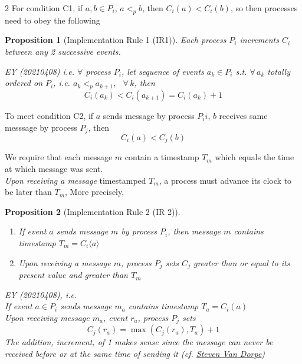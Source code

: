 \documentclass[10pt]{amsart}
\newtheorem{proposition}{Proposition}
\begin{document}
\begin{multicols*}{2}
For condition C1, if $a,b \in P_i$, $a<_p b$, then $C_i(a) < C_i(b)$, so then processes need to obey the following

\begin{proposition}[Implementation Rule 1 (IR1)]\label{IR1}
Each process $P_i$ increments $C_i$ between any 2 successive events.

EY (20210408) i.e. $\forall $ process $P_i$, let sequence of events $a_k \in P_i$ s.t. $\forall \, a_k$ totally ordered on $P_i$, i.e. $a_k <_p a_{k+1}$, \, $\forall \, k$, then
\begin{equation}
\boxed{ 
	C_i(a_k) < C_i(a_{k+1}) = C_i(a_k) + 1 }
\end{equation}
\end{proposition} 

To meet condition C2, if $a$ sends message by process $P_ii$, $b$ receives same messsage by process $P_j$, then 
\[
C_i(a) < C_j(b)
\]

We require that each message $m$ contain a timestamp $T_m$ which equals the time at which message was sent.\\
\emph{Upon receiving a message} timestamped $T_m$, a process must advance its clock to be later than $T_m$, More precisely,

\begin{proposition}[Implementation Rule 2 (IR 2)]
\begin{enumerate}
	\item If event $a$ sends message $m$ by process $P_i$, then message $m$ contains timestamp $T_m = C_i\langle a \rangle$
	\item Upon receiving a message $m$, process $P_j$ sets $C_j$ greater than or equal to its present value and greater than $T_m$
\end{enumerate}

EY (20210408), i.e. \\

If event $ a\in P_i$ sends message $m_a$ contains timestamp $T_a = C_i(a)$ \\
Upon receiving message $m_a$, event $r_a$, process $P_j$ sets 
\begin{equation}
\boxed{
	C_j(r_a) = \max{ (C_j(r_a), T_a)} + 1
}
\end{equation} 
The addition, increment, of 1 makes sense since the message can never be received before or at the same time of sending it (cf. \href{https://towardsdatascience.com/understanding-lamport-timestamps-with-pythons-multiprocessing-library-12a6427881c6}{Steven Van Dorpe})


\end{proposition}
\end{multicols*}
\end{document}
